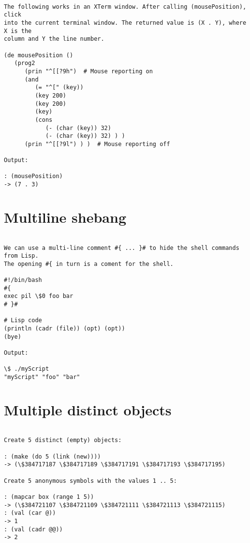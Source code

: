 \begin{verbatim}

The following works in an XTerm window. After calling (mousePosition), click
into the current terminal window. The returned value is (X . Y), where X is the
column and Y the line number.

(de mousePosition ()
   (prog2
      (prin "^[[?9h")  # Mouse reporting on
      (and
         (= "^[" (key))
         (key 200)
         (key 200)
         (key)
         (cons
            (- (char (key)) 32)
            (- (char (key)) 32) ) )
      (prin "^[[?9l") ) )  # Mouse reporting off

Output:

: (mousePosition)
-> (7 . 3)

\end{verbatim}

\section*{Multiline shebang}

\begin{verbatim}

We can use a multi-line comment #{ ... }# to hide the shell commands from Lisp.
The opening #{ in turn is a coment for the shell.

#!/bin/bash
#{
exec pil \$0 foo bar
# }#

# Lisp code
(println (cadr (file)) (opt) (opt))
(bye)

Output:

\$ ./myScript
"myScript" "foo" "bar"

\end{verbatim}

\section*{Multiple distinct objects}

\begin{verbatim}

Create 5 distinct (empty) objects:

: (make (do 5 (link (new))))
-> (\$384717187 \$384717189 \$384717191 \$384717193 \$384717195)

Create 5 anonymous symbols with the values 1 .. 5:

: (mapcar box (range 1 5))
-> (\$384721107 \$384721109 \$384721111 \$384721113 \$384721115)
: (val (car @))
-> 1
: (val (cadr @@))
-> 2

\end{verbatim}


